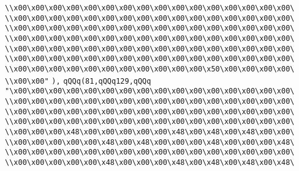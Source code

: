 \verb|\\x00\x00\x00\x00\x00\x00\x00\x00\x00\x00\x00\x00\x00\x00\x00\x00\|\newline
\verb|\\x00\x00\x00\x00\x00\x00\x00\x00\x00\x00\x00\x00\x00\x00\x00\x00\|\newline
\verb|\\x00\x00\x00\x00\x00\x00\x00\x00\x00\x00\x00\x00\x00\x00\x00\x00\|\newline
\verb|\\x00\x00\x00\x00\x00\x00\x00\x00\x00\x00\x00\x00\x00\x00\x00\x00\|\newline
\verb|\\x00\x00\x00\x00\x00\x00\x00\x00\x00\x00\x00\x00\x00\x00\x00\x00\|\newline
\verb|\\x00\x00\x00\x00\x00\x00\x00\x00\x00\x00\x00\x00\x00\x00\x00\x00\|\newline
\verb|\\x00\x00\x00\x00\x00\x00\x00\x00\x00\x00\x00\x50\x00\x00\x00\x00\|\newline
\verb|\\x00\x00"|\newline
\verb|),|\newline
\verb|qQQq(81,qQQq129,qQQq|\newline
\verb|"\x00\x00\x00\x00\x00\x00\x00\x00\x00\x00\x00\x00\x00\x00\x00\x00\|\newline
\verb|\\x00\x00\x00\x00\x00\x00\x00\x00\x00\x00\x00\x00\x00\x00\x00\x00\|\newline
\verb|\\x00\x00\x00\x00\x00\x00\x00\x00\x00\x00\x00\x00\x00\x00\x00\x00\|\newline
\verb|\\x00\x00\x00\x00\x00\x00\x00\x00\x00\x00\x00\x00\x00\x00\x00\x00\|\newline
\verb|\\x00\x00\x00\x48\x00\x00\x00\x00\x00\x48\x00\x48\x00\x48\x00\x00\|\newline
\verb|\\x00\x00\x00\x00\x00\x48\x00\x48\x00\x00\x00\x48\x00\x00\x00\x48\|\newline
\verb|\\x00\x00\x00\x00\x00\x00\x00\x00\x00\x00\x00\x00\x00\x00\x00\x00\|\newline
\verb|\\x00\x00\x00\x00\x00\x48\x00\x00\x00\x48\x00\x48\x00\x48\x00\x48\|\newline
